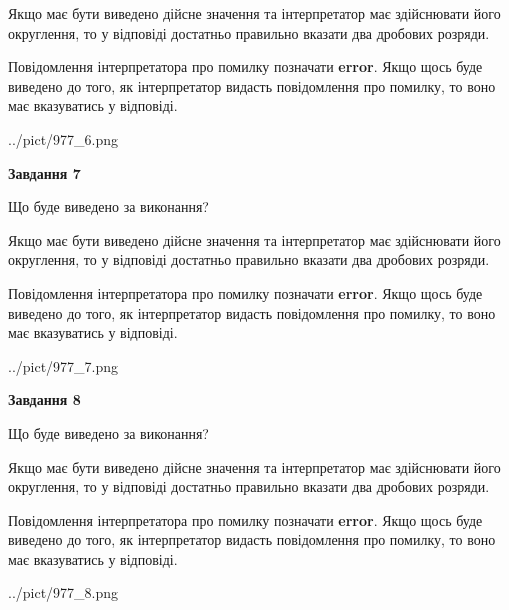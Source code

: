 \documentclass[12pt, ukrainian]{article}
\begin{document}
{\begin {Large}
Якщо має бути виведено дійсне значення та інтерпретатор має здійснювати його округлення, 
то у відповіді достатньо правильно вказати два дробових розряди.

Повідомлення інтерпретатора про помилку позначати \textbf{error}.
Якщо щось буде виведено до того, як інтерпретатор видасть повідомлення про помилку, 
то воно має вказуватись у відповіді. \par

\begin{center}
	{../pict/977_6.png}
\end{center}
\newpage

{\begin {center}\textbf{Завдання 7}\end {center}}\par
Що буде виведено за виконання? \par

Якщо має бути виведено дійсне значення та інтерпретатор має здійснювати його округлення, 
то у відповіді достатньо правильно вказати два дробових розряди.

Повідомлення інтерпретатора про помилку позначати \textbf{error}.
Якщо щось буде виведено до того, як інтерпретатор видасть повідомлення про помилку, 
то воно має вказуватись у відповіді. \par

\begin{center}
	{../pict/977_7.png}
\end{center}
\newpage

{\begin {center}\textbf{Завдання 8}\end {center}}\par
Що буде виведено за виконання? \par

Якщо має бути виведено дійсне значення та інтерпретатор має здійснювати його округлення, 
то у відповіді достатньо правильно вказати два дробових розряди.

Повідомлення інтерпретатора про помилку позначати \textbf{error}.
Якщо щось буде виведено до того, як інтерпретатор видасть повідомлення про помилку, 
то воно має вказуватись у відповіді. \par

\begin{center}
	{../pict/977_8.png}
\end{center}
\newpage


\end{Large}}
\end{document}
